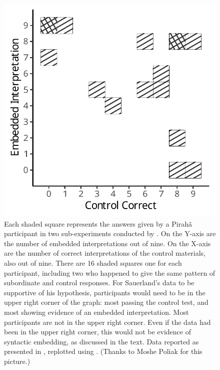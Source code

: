 \documentclass{article}
\begin{document}
\begin{figure}
    \includegraphics[width=.9\textwidth]{gibson_figure1.pdf}
    \caption{Each shaded square represents the answers given by a Pirahã participant in two sub-experiments conducted by \citet{sauerland2018false}. On the Y-axis are the number of embedded interpretations out of nine. On the X-axis are the number of correct interpretations of the control materials, also out of nine. There are 16 shaded squares one for each participant, including two who happened to give the same pattern of subordinate and control responses.  \newline \newline For Sauerland's data to be supportive of his hypothesis, participants would need to be in the upper right corner of the graph:  most passing the control test, and most showing evidence of an embedded interpretation.  Most participants are not in the upper right corner. Even if the data had been in the upper right corner, this would not be evidence of syntactic embedding, as discussed in the text. \newline \newline
    Data reported as presented in \citet{sauerland2018false}, replotted using \citet{r2023, wickham2016, ggpattern2022}. (Thanks to Moshe Poliak for this picture.)}
    \label{fig:gibson:fig1}
\end{figure}
\end{document}
